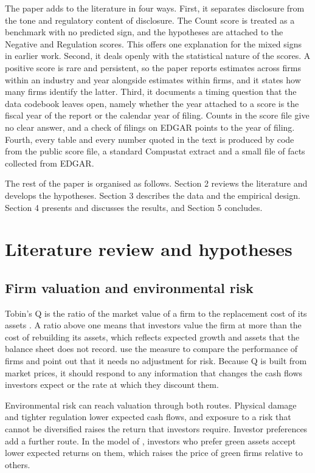 \documentclass[12pt,a4paper]{article}
\begin{document}
The paper adds to the literature in four ways. First, it separates disclosure from the tone and regulatory content of disclosure. The Count score is treated as a benchmark with no predicted sign, and the hypotheses are attached to the Negative and Regulation scores. This offers one explanation for the mixed signs in earlier work. Second, it deals openly with the statistical nature of the scores. A positive score is rare and persistent, so the paper reports estimates across firms within an industry and year alongside estimates within firms, and it states how many firms identify the latter. Third, it documents a timing question that the data codebook leaves open, namely whether the year attached to a score is the fiscal year of the report or the calendar year of filing. Counts in the score file give no clear answer, and a check of filings on EDGAR points to the year of filing. Fourth, every table and every number quoted in the text is produced by code from the public score file, a standard Compustat extract and a small file of facts collected from EDGAR.

The rest of the paper is organised as follows. Section 2 reviews the literature and develops the hypotheses. Section 3 describes the data and the empirical design. Section 4 presents and discusses the results, and Section 5 concludes.

\section{Literature review and hypotheses}

\subsection{Firm valuation and environmental risk}

Tobin's Q is the ratio of the market value of a firm to the replacement cost of its assets \citep{tobin1969}. A ratio above one means that investors value the firm at more than the cost of rebuilding its assets, which reflects expected growth and assets that the balance sheet does not record. \citet{lang1994} use the measure to compare the performance of firms and point out that it needs no adjustment for risk. Because Q is built from market prices, it should respond to any information that changes the cash flows investors expect or the rate at which they discount them.

Environmental risk can reach valuation through both routes. Physical damage and tighter regulation lower expected cash flows, and exposure to a risk that cannot be diversified raises the return that investors require. Investor preferences add a further route. In the model of \citet{pastor2021}, investors who prefer green assets accept lower expected returns on them, which raises the price of green firms relative to others.
\end{document}
